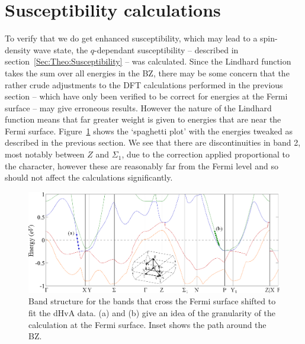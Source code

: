 
\section{Susceptibility calculations}
    \label{Sec:ResD:SubsceptibilityCalculation}

To verify that we do get enhanced susceptibility, which may lead to a spin-density wave state, the $q$-dependant susceptibility -- described in section~\ref{Sec:Theo:Susceptibility} -- was calculated. Since the Lindhard function takes the sum over all energies in the \ac{BZ}, there may be some concern that the rather crude adjustments to the \ac{DFT} calculations performed in the previous section -- which have only been verified to be correct for energies at the Fermi surface -- may give erroneous results. However the nature of the Lindhard function means that far greater weight is given to energies that are near the Fermi surface. Figure~\ref{Fig:ResD:ShiftedBandStructure} shows the `spaghetti plot' with the energies tweaked as described in the previous section. We see that there are discontinuities in band 2, most notably between $Z$ and $\Sigma_1$, due to the correction applied proportional to the \DzTwo character, however these are reasonably far from the Fermi level and so should not affect the calculations significantly.
\begin{figure}[htbp]
    \begin{center}
        \includegraphics[scale=0.9]{Chapter-dHvABaFe2P2/Figures/AngleDepMeasurements/ShiftedBandStructure/ShiftedBandStructure}
        \caption{Band structure for the bands that cross the Fermi surface shifted to fit the dHvA data. (a) and (b) give an idea of the granularity of the \WIEN calculation at the Fermi surface. Inset shows the path around the \ac{BZ}.}
        \label{Fig:ResD:ShiftedBandStructure}
    \end{center}
\end{figure}

